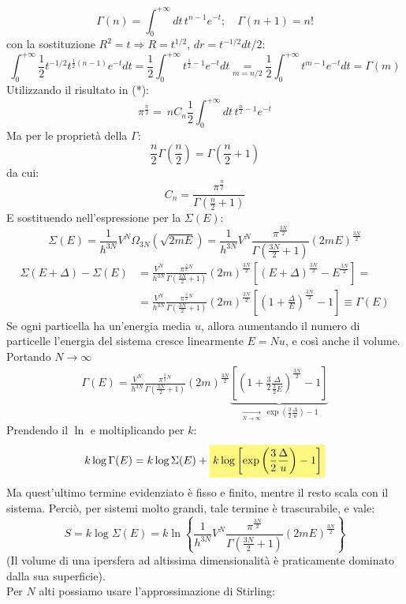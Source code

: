 \documentclass[../MeccanicaStatistica.tex]{subfiles}
\begin{document}
\[
\Gamma(n) =\int_0^{+\infty} dt\,t^{n-1}e^{-t}; \quad \Gamma(n+1)=n!
\]
con la sostituzione $R^2=t \Rightarrow R=t^{1/2}$, $dr = t^{-1/2}dt/2$:
\[
\int_0^{+\infty} \frac{1}{2}t^{-1/2} t^{\frac{1}{2}(n-1)}e^{-t}dt = \frac{1}{2}\int_0^{+\infty}t^{\frac{1}{2}-1}e^{-t}dt \underset{m=n/2}{=} \frac{1}{2}\int_0^{+\infty}t^{m-1}e^{-t}dt=\Gamma(m)
\]
Utilizzando il risultato in (*):
\[
\pi^{\frac{n}{2}} =\ nC_n \frac{1}{2}\int_0^{+\infty}dt\,t^{\frac{n}{2}-1}e^{-t}
\]
Ma per le proprietà della $\Gamma$:
\[
\frac{n}{2}\Gamma\left(\frac{n}{2}\right) =\Gamma\left(\frac{n}{2}+1\right)
\]
da cui:
\[
C_n = \frac{\pi^{\frac{n}{2}}}{\Gamma\left(\frac{n}{2}+1\right)}
\]
E sostituendo nell'espressione per la $\Sigma(E)$:
\[
\Sigma(E) = \frac{1}{h^{3N}}V^N \Omega_{3N}(\sqrt{2mE}) = \frac{1}{h^{3N}}V^N \frac{\pi^{\frac{3N}{2}}}{\Gamma\left(\frac{3N}{2}+1\right)}(2mE)^{\frac{3N}{2}}
\]
\begin{align*}
\Sigma(E+\Delta)-\Sigma(E)&=\frac{V^N}{h^{3N}}\frac{\pi^{\frac{3}{2}N}}{\Gamma\left(\frac{3N}{2}+1\right)}(2m)^{\frac{3N}{2}}
\left[(E+\Delta)^{\frac{3N}{2}}-E^{\frac{3N}{2}}\right] =\\
&= \frac{V^N}{h^{3N}}\frac{\pi^{\frac{3}{2}N}}{\Gamma\left(\frac{3N}{2}+1\right)}(2m)^{\frac{3N}{2}} \left [\left(1+\frac{\Delta}{E}\right)^{\frac{3N}{2}}-1\right] \equiv \Gamma(E) 
\end{align*}
Se ogni particella ha un'energia media $u$, allora aumentando il numero di particelle l'energia del sistema cresce linearmente $E=Nu$, e così anche il volume. Portando $N\to\infty$
\begin{align*}
\Gamma(E) = \frac{V^N}{h^{3N}}\frac{\pi^{\frac{3}{2}N}}{\Gamma\left(\frac{3N}{2}+1\right)}(2m)^{\frac{3N}{2}} \underbrace{\left [\left(1+\frac{3}{2}\frac{\Delta}{\frac{3}{2}E}\right)^{\frac{3N}{2}}-1\right]}_{\xrightarrow[N\to\infty]{}\>\exp\left(\frac{3}{2}\frac{\Delta}{u}\right)-1}
\end{align*}
Prendendo il $\ln$ e moltiplicando per $k$:
\[
k\log\Gamma(E)=k\log\Sigma(E)+\hlc{Yellow}{k\log\left[\exp\left(\frac{3}{2}\frac{\Delta}{u}\right)-1\right]
}\]
Ma quest'ultimo termine evidenziato è fisso e finito, mentre il resto scala con il sistema. Perciò, per sistemi molto grandi, tale termine è trascurabile, e vale:
\[
S=k\log\Sigma(E)=k\ln\left\{
\frac{1}{h^{3N}}V^N \frac{\pi^{\frac{3N}{2}}}{\Gamma\left(\frac{3N}{2}+1\right)}(2mE)^{\frac{3N}{2}}
 \right \}
\]
(Il volume di una ipersfera ad altissima dimensionalità è praticamente dominato dalla sua superficie).\\
Per $N$ alti possiamo usare l'approssimazione di Stirling:
\end{document}
